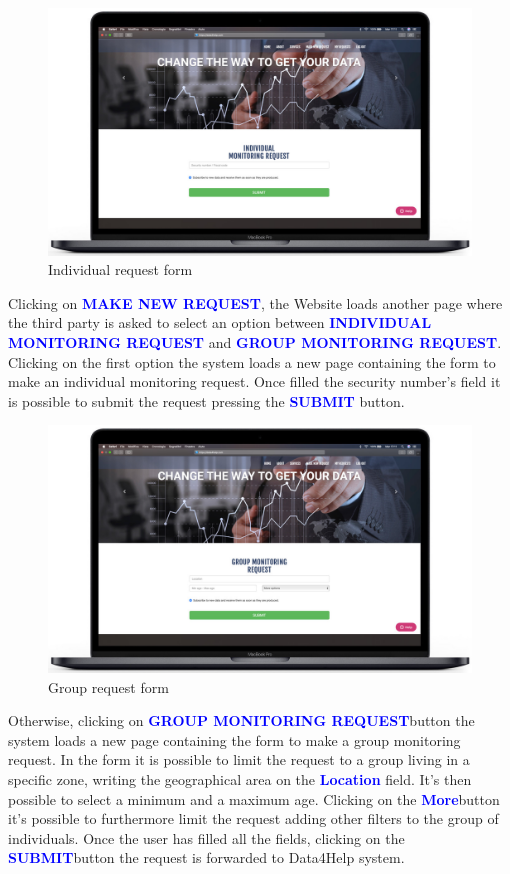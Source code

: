 \begin{enumerate}
\begin{figure}[H]
        \centering
          \includegraphics[scale = 0.33]{Images/Mockups/IndividualRequest.jpg}
          	\caption{Individual request form}
\end{figure}
Clicking on {\textcolor{Blue}{\textbf{MAKE NEW REQUEST}}}, the Website loads another page where the third party is asked to select an option between {\textcolor{Blue}{\textbf{INDIVIDUAL MONITORING REQUEST}}} and {\textcolor{Blue}{\textbf{GROUP MONITORING REQUEST}}}. Clicking on the first option the system loads a new page containing the form to make an individual monitoring request. Once filled the security number's field it is possible to submit the request pressing the {\textcolor{Blue}{\textbf{SUBMIT}}} button.
\clearpage

\begin{figure}[H]
        \centering
          \includegraphics[scale = 0.33]{Images/Mockups/GroupRequest.jpg}
          	\caption{Group request form}
\end{figure}
Otherwise, clicking on {\textcolor{Blue}{\textbf{GROUP MONITORING REQUEST}}}button the system loads a new page containing the form to make a group monitoring request. In the form it is possible to limit the request to a group living in a specific zone, writing the geographical area on the {\textcolor{Blue}{\textbf{Location}}} field. It's then possible to select a minimum and a maximum age. Clicking on the {\textcolor{Blue}{\textbf{More}}}button it's possible to furthermore limit the request adding other filters to the group of individuals. Once the user has filled all the fields, clicking on the {\textcolor{Blue}{\textbf{SUBMIT}}}button the request is forwarded to Data4Help system.
\clearpage


\end{enumerate}
